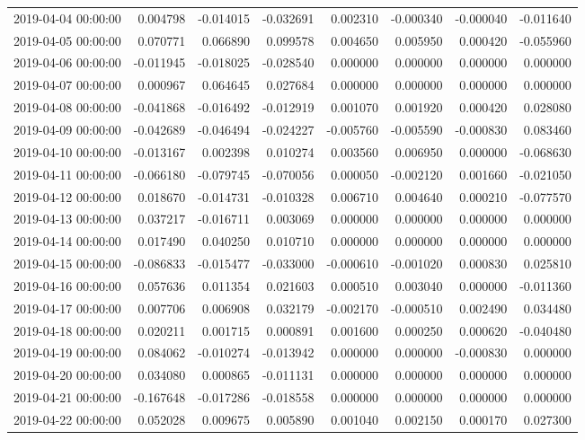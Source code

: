\begin{tabular}{lrrrrrrr}
2019-04-04 00:00:00 & 0.004798 & -0.014015 & -0.032691 & 0.002310 & -0.000340 & -0.000040 & -0.011640 \\
2019-04-05 00:00:00 & 0.070771 & 0.066890 & 0.099578 & 0.004650 & 0.005950 & 0.000420 & -0.055960 \\
2019-04-06 00:00:00 & -0.011945 & -0.018025 & -0.028540 & 0.000000 & 0.000000 & 0.000000 & 0.000000 \\
2019-04-07 00:00:00 & 0.000967 & 0.064645 & 0.027684 & 0.000000 & 0.000000 & 0.000000 & 0.000000 \\
2019-04-08 00:00:00 & -0.041868 & -0.016492 & -0.012919 & 0.001070 & 0.001920 & 0.000420 & 0.028080 \\
2019-04-09 00:00:00 & -0.042689 & -0.046494 & -0.024227 & -0.005760 & -0.005590 & -0.000830 & 0.083460 \\
2019-04-10 00:00:00 & -0.013167 & 0.002398 & 0.010274 & 0.003560 & 0.006950 & 0.000000 & -0.068630 \\
2019-04-11 00:00:00 & -0.066180 & -0.079745 & -0.070056 & 0.000050 & -0.002120 & 0.001660 & -0.021050 \\
2019-04-12 00:00:00 & 0.018670 & -0.014731 & -0.010328 & 0.006710 & 0.004640 & 0.000210 & -0.077570 \\
2019-04-13 00:00:00 & 0.037217 & -0.016711 & 0.003069 & 0.000000 & 0.000000 & 0.000000 & 0.000000 \\
2019-04-14 00:00:00 & 0.017490 & 0.040250 & 0.010710 & 0.000000 & 0.000000 & 0.000000 & 0.000000 \\
2019-04-15 00:00:00 & -0.086833 & -0.015477 & -0.033000 & -0.000610 & -0.001020 & 0.000830 & 0.025810 \\
2019-04-16 00:00:00 & 0.057636 & 0.011354 & 0.021603 & 0.000510 & 0.003040 & 0.000000 & -0.011360 \\
2019-04-17 00:00:00 & 0.007706 & 0.006908 & 0.032179 & -0.002170 & -0.000510 & 0.002490 & 0.034480 \\
2019-04-18 00:00:00 & 0.020211 & 0.001715 & 0.000891 & 0.001600 & 0.000250 & 0.000620 & -0.040480 \\
2019-04-19 00:00:00 & 0.084062 & -0.010274 & -0.013942 & 0.000000 & 0.000000 & -0.000830 & 0.000000 \\
2019-04-20 00:00:00 & 0.034080 & 0.000865 & -0.011131 & 0.000000 & 0.000000 & 0.000000 & 0.000000 \\
2019-04-21 00:00:00 & -0.167648 & -0.017286 & -0.018558 & 0.000000 & 0.000000 & 0.000000 & 0.000000 \\
2019-04-22 00:00:00 & 0.052028 & 0.009675 & 0.005890 & 0.001040 & 0.002150 & 0.000170 & 0.027300 \\

\end{tabular}
